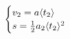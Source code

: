 \begin{equation} \begin{cases}v_{2}=a\langle t_{2}\rangle\\ s=\frac{1}{2}a_{2}\langle t_{2}\rangle^{2}\\ \end{cases}\ \\  \end{equation}
